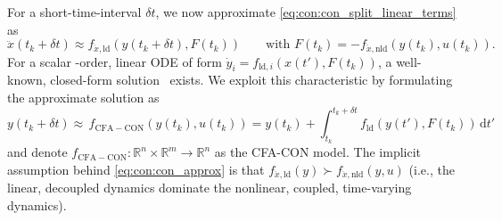 For a short-time-interval $\delta t$, we now approximate \eqref{eq:con:con_split_linear_terms} as
\begin{equation}\label{eq:con:con_approx}
    \ddot{x}(t_k+\delta t) \approx f_{\ddot{x}, \mathrm{ld}}(y(t_k+\delta t), F(t_k)) 
    \qquad \text{with  }
    F(t_k) =  -f_{\ddot{x}, \mathrm{nld}}(y(t_k), u(t_k)).
\end{equation}
For a scalar -order, linear \gls{ODE} of form $\dot{y}_i = f_{\mathrm{ld},i}(x(t'), F(t_k))$, a well-known, closed-form solution~\citep{Pas2023damped} exists.
We exploit this characteristic by formulating the approximate solution as 
\begin{equation}\label{eq:con:cfa_con}
    y(t_k + \delta t) \approx \, f_\mathrm{CFA-CON}(y(t_k), u(t_k)) =  y(t_k) + \int_{t_k}^{t_k + \delta t} f_{\mathrm{ld}}(y(t'), F(t_k)) \, \mathrm{d}t'
\end{equation}
and denote $f_\mathrm{CFA-CON}: \mathbb{R}^n \times \mathbb{R}^m \to \mathbb{R}^n$ as the \gls{CFA-CON} model.
The implicit assumption behind \eqref{eq:con:con_approx} is that $f_{\ddot{x}, \mathrm{ld}}(y) \succ f_{\ddot{x}, \mathrm{nld}}(y, u)$ (i.e., the linear, decoupled dynamics dominate the nonlinear, coupled, time-varying dynamics).



